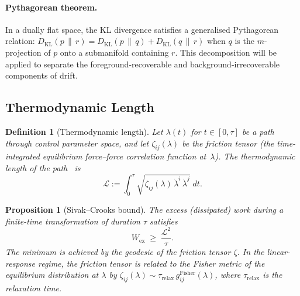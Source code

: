 \documentclass[12pt,a4paper,openany]{book}
\newtheorem{proposition}[theorem]{Proposition}
\newtheorem{definition}[theorem]{Definition}
\begin{document}
\paragraph{Pythagorean theorem.}
In a dually flat space, the KL divergence satisfies
a generalised Pythagorean relation:
$D_{\mathrm{KL}}(p\,\|\,r)
= D_{\mathrm{KL}}(p\,\|\,q)
+ D_{\mathrm{KL}}(q\,\|\,r)$
when $q$ is the $m$-projection of $p$ onto a
submanifold containing $r$.
This decomposition will be applied to separate the
foreground-recoverable and background-irrecoverable
components of drift.

\subsection{Thermodynamic Length}
\label{T-III-subsec:thermo_length}

\begin{definition}[Thermodynamic length]
\label{T-III-def:thermo_length}
Let $\lambda(t)$ for $t \in [0,\tau]$ be a path through
control parameter space, and let $\zeta_{ij}(\lambda)$ be the
\emph{friction tensor} (the time-integrated equilibrium
force--force correlation function at~$\lambda$).
The \emph{thermodynamic length} of the
path~\cite{Crooks2007} is
\begin{equation}
\label{T-III-eq:thermo_length}
\mathcal{L}
:= \int_0^\tau
\sqrt{\zeta_{ij}(\lambda)\,
  \dot{\lambda}^i\,\dot{\lambda}^j}\;dt.
\end{equation}
\end{definition}

\begin{proposition}[Sivak--Crooks bound]
\label{T-III-prop:sivak_crooks}
The excess (dissipated) work during a finite-time
transformation of duration $\tau$ satisfies~\cite{SivakCrooks2012}
\begin{equation}
\label{T-III-eq:sivak_crooks}
W_{\mathrm{ex}} \;\geq\; \frac{\mathcal{L}^2}{\tau}.
\end{equation}
The minimum is achieved by the geodesic of the friction
tensor $\zeta$.
In the linear-response regime, the friction tensor is
related to the Fisher metric of the equilibrium distribution
at $\lambda$ by
$\zeta_{ij}(\lambda)
\sim \tau_{\mathrm{relax}}\,g_{ij}^{\mathrm{Fisher}}(\lambda)$,
where $\tau_{\mathrm{relax}}$ is the relaxation time.
\end{proposition}

\end{document}
